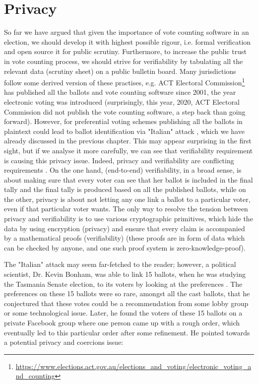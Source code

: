 \section{Privacy}
   So far we have argued that given the  importance of vote counting software in an election, we should 
   develop it with highest possible rigour, i.e. formal verification and open source it for public scrutiny. Furthermore, 
   to increase the public trust in vote counting process, we should strive for verifiability by tabulating all the 
   relevant data (scrutiny sheet) on a public bulletin board.  Many jurisdictions follow some derived version of these practises, e.g.  ACT Electoral 
   Commission\footnote{\url{https://www.elections.act.gov.au/elections_and_voting/electronic_voting_and_counting}}
   has published all the ballots and vote counting software since 2001, the year electronic voting  was introduced 
   (surprisingly,  this year,  2020,  ACT Electoral Commission did not  publish the vote counting software, a step back than 
   going forward).  However, for preferential voting schemes publishing all the ballots in plaintext could lead to ballot identification
   via "Italian" attack \citep{Otten}, which we have already discussed in the previous chapter.    This may appear surprising in the 
   first sight,  but if we analyse it more carefully,  we can see that verifiability requirement is causing this privacy issue.   Indeed, 
   privacy and verifiability are conflicting requirements \citep{JONKER20131}.  
   On the one hand,  (end-to-end) verifiability, in a broad sense,  is about making sure that
   every voter can see that her ballot is included in the final tally and the final tally is produced based on all the published ballots, 
   while on the other, privacy is about not letting any one link a ballot to a particular voter,  even if that particular voter wants.  
   The only way to resolve the tension between privacy 
   and verifiability is to use various cryptographic primitives,  which hide the data  by using encryption (privacy) and 
   ensure that every claim is accompanied by a mathematical proofs (verifiability) (these proofs are in form of data which 
   can be checked by anyone,  and one such proof system is zero-knowledge-proof).  
   
   
   The "Italian" attack may seem far-fetched to the reader; however,  a political scientist,  Dr. Kevin Bonham,
    was able to link  15 ballots, when he was studying the Tasmania Senate election,  
   to its voters by looking at the preferences \citep{TasmaniaVoting}. The preferences on these 15 ballots were so rare, amongst 
   all the cast ballots,  that  he conjectured that these votes could be a recommendation from some lobby group 
   or some technological issue. 
   Later, he found the voters of these 15 ballots on a private Facebook 
   group where one person came up with a rough order,  which eventually led to this particular order after 
   some refinement.  He pointed \citep{TasmaniaVoting} towards a potential privacy and coercions issue:
   
